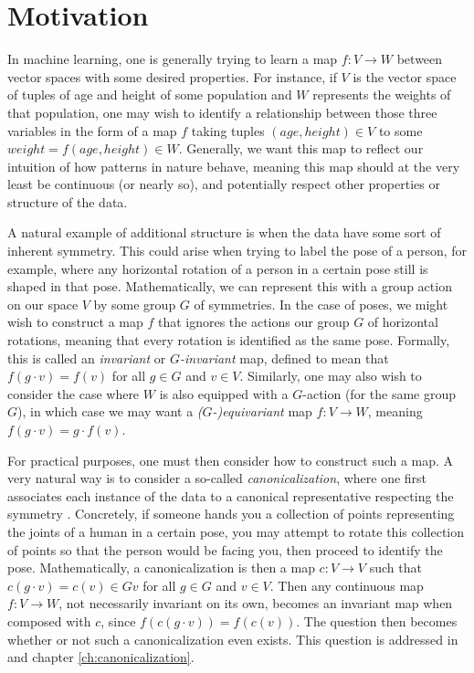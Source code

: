 \section{Motivation}
In machine learning, one is generally trying to learn a map $f : V \to W$ between vector spaces with some desired properties.
For instance, if $V$ is the vector space of tuples of age and height of some population and $W$ represents the weights of that population, one may wish to identify a relationship between those three variables in the form of a map $f$ taking tuples $(age, height) \in V$ to some $weight = f(age, height) \in W$.
Generally, we want this map to reflect our intuition of how patterns in nature behave, meaning this map should at the very least be continuous (or nearly so), and potentially respect other properties or structure of the data.

A natural example of additional structure is when the data have some sort of inherent symmetry.
This could arise when trying to label the pose of a person, for example, where any horizontal rotation of a person in a certain pose still is shaped in that pose.
Mathematically, we can represent this with a group action on our space $V$ by some group $G$ of symmetries.
In the case of poses, we might wish to construct a map $f$ that ignores the actions our group $G$ of horizontal rotations, meaning that every rotation is identified as the same pose.
Formally, this is called an \emph{invariant} or \emph{$G$-invariant} map, defined to mean that $f(g \cdot v) = f(v)$ for all $g \in G$ and $v \in V$.
Similarly, one may also wish to consider the case where $W$ is also equipped with a $G$-action (for the same group $G$), in which case we may want a \emph{($G$-)equivariant} map $f : V \to W$, meaning $f(g \cdot v) = g \cdot f(v)$.

For practical purposes, one must then consider how to construct such a map.
A very natural way is to consider a so-called \emph{canonicalization}, where one first associates each instance of the data to a canonical representative respecting the symmetry \cite{dym2024equivariant}.
Concretely, if someone hands you a collection of points representing the joints of a human in a certain pose, you may attempt to rotate this collection of points so that the person would be facing you, then proceed to identify the pose.
Mathematically, a canonicalization is then a map $c : V \to V$ such that $c(g \cdot v) = c(v) \in Gv$ for all $g \in G$ and $v \in V$.
Then any continuous map $f : V \to W$, not necessarily invariant on its own, becomes an invariant map when composed with $c$, since $f(c(g \cdot v)) = f(c(v))$.
The question then becomes whether or not such a canonicalization even exists.
This question is addressed in \cite{dym2024equivariant} and chapter \ref{ch:canonicalization}.

